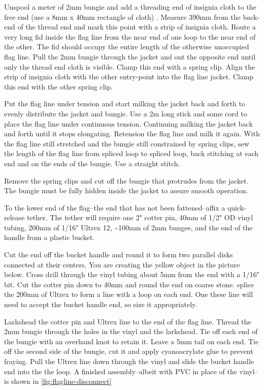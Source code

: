 \documentclass[]{book}
\begin{document}
Unspool a meter of 2mm bungie and add a threading end of insignia cloth to the free end (use a 8mm x 40mm rectangle of cloth) . Measure 390mm from the back-end of the thread end and mark this point with a strip of insignia cloth. Route a very long fid inside the flag line from the near end of one loop to the near end of the other. The fid should occupy the entire length of the otherwise unoccupied flag line. Pull the 2mm bungie through the jacket and out the opposite end until only the thread end cloth is visible. Clamp this end with a spring clip. Align the strip of insignia cloth with the other entry-point into the flag line jacket. Clamp this end with the other spring clip.

Put the flag line under tension and start milking the jacket back and forth to evenly distribute the jacket and bungie. Use a 2m long stick and some cord to place the flag line under continuous tension. Continuing milking the jacket back and forth until it stops elongating. Retension the flag line and milk it again. With the flag line still stretched and the bungie still constrained by spring clips, sew the length of the flag line from spliced loop to spliced loop, back stitching at each end and on the ends of the bungie. Use a straight stitch.

Remove the spring clips and cut off the bungie that protrudes from the jacket. The bungie must be fully hidden inside the jacket to assure smooth operation.

To the lower end of the flag--the end that has not been fattened--affix a quick-release tether. The tether will require one 2" cotter pin, 40mm of 1/2" OD vinyl tubing, 200mm of 1/16" Ultrex 12, \textasciitilde{}100mm of 2mm bungee, and the end of the handle from a plastic bucket.

Cut the end off the bucket handle and round it to form two parallel disks connected at their centers. You are creating the yellow object in the picture below. Cross drill through the vinyl tubing about 5mm from the end with a 1/16" bit. Cut the cotter pin down to 40mm and round the end on coarse stone. splice the 200mm of Ultrex to form a line with a loop on each end. One these line will need to accept the bucket handle end, so size it appropriately.

Larkshead the cotter pin and Ultrex line to the end of the flag line. Thread the 2mm bungie through the holes in the vinyl and the larkshead. Tie off each end of the bungie with an overhand knot to retain it. Leave a 5mm tail on each end. Tie off the second side of the bungie, cut it and apply cyanoacrylate glue to prevent fraying. Pull the Ultrex line down through the vinyl and slide the bucket handle end into the the loop. A finished assembly--albeit with PVC in place of the vinyl--is shown in \ref{fig:flagline-disconnect}
\end{document}
